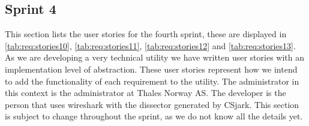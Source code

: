 \begin{table}[htbp] \footnotesize \center
\caption{User stories - Sprint 3 part 4\label{tab:req:stories10}}
\noindent{}
\end{table}

\subsection{Sprint 4}
\label{sec:req:stories4}
This section lists the user stories for the fourth sprint, these are displayed in \autoref{tab:req:stories10}, \autoref{tab:req:stories11}, \autoref{tab:req:stories12} and \autoref{tab:req:stories13}.
As we are developing a very technical \gls{utility} we have written user stories with an implementation level of abstraction. 
These user stories represent how we intend to add the functionality of each requirement to the \gls{utility}.
The administrator in this context is the administrator at Thales Norway AS. 
The developer is the person that uses \Gls{wireshark} with the \gls{dissector} generated by CSjark.
This section is subject to change throughout the sprint, as we do not know all the details yet.


